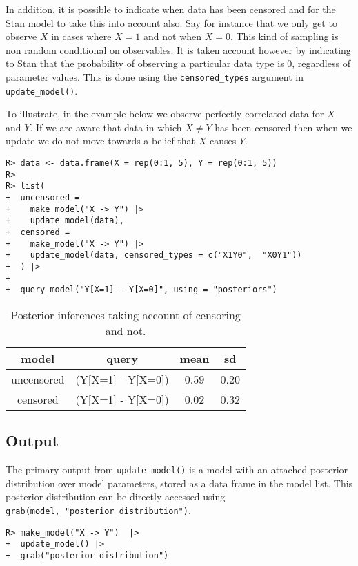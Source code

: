 \documentclass[
  11pt,
  article]{jss}
\begin{document}
In addition, it is possible to indicate when data has been censored and
for the Stan model to take this into account also. Say for instance that
we only get to observe \(X\) in cases where \(X=1\) and not when
\(X=0\). This kind of sampling is non random conditional on observables.
It is taken account however by indicating to Stan that the probability
of observing a particular data type is 0, regardless of parameter
values. This is done using the \texttt{censored\_types} argument in
\texttt{update\_model()}.

To illustrate, in the example below we observe perfectly correlated data
for \(X\) and \(Y\). If we are aware that data in which \(X \neq Y\) has
been censored then when we update we do not move towards a belief that
\(X\) causes \(Y\).

\begin{verbatim}
R> data <- data.frame(X = rep(0:1, 5), Y = rep(0:1, 5))
R> 
R> list(
+  uncensored = 
+    make_model("X -> Y") |>
+    update_model(data),
+  censored = 
+    make_model("X -> Y") |>
+    update_model(data, censored_types = c("X1Y0",  "X0Y1"))
+  ) |>
+  
+  query_model("Y[X=1] - Y[X=0]", using = "posteriors") 
\end{verbatim}

\hypertarget{tbl-censored}{}
\begin{longtable}[t]{cccc}
\caption{\label{tbl-censored}Posterior inferences taking account of censoring and not. }\tabularnewline

\toprule
model & query & mean & sd\\
\midrule
uncensored & (Y[X=1] - Y[X=0]) & 0.59 & 0.20\\
censored & (Y[X=1] - Y[X=0]) & 0.02 & 0.32\\
\bottomrule
\end{longtable}

\hypertarget{output}{%
\subsection{Output}\label{output}}

The primary output from \texttt{update\_model()} is a model with an
attached posterior distribution over model parameters, stored as a data
frame in the model list. This posterior distribution can be directly
accessed using \texttt{grab(model,\ "posterior\_distribution")}.

\begin{verbatim}
R> make_model("X -> Y")  |> 
+  update_model() |>
+  grab("posterior_distribution")  
\end{verbatim}
\end{document}
